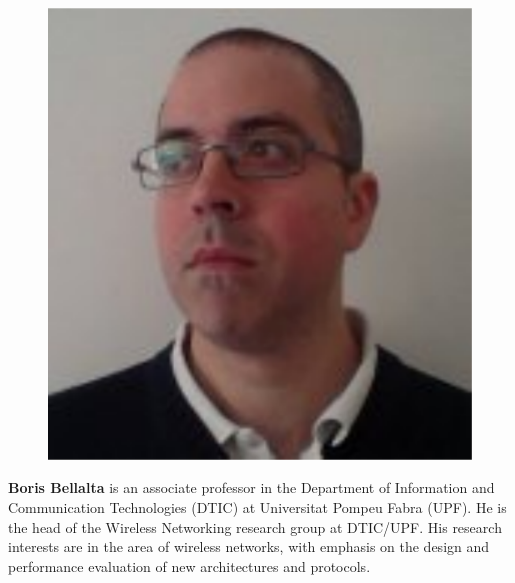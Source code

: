 \documentclass[10pt,a4paper,twocolumn]{article}
\newcommand{\ITUpar}{\vspace{8pt}\par}
\def\startfigure{\vspace{6pt}\begin{figure}[ht]\center}
\begin{document}
\startfigure\includegraphics[width=0.4\columnwidth]{img/bbellalta} 
\end{figure}\textbf{Boris Bellalta} is an associate professor in the Department of Information and Communication Technologies (DTIC) at Universitat Pompeu Fabra (UPF). He is the head of the Wireless Networking research group at DTIC/UPF. His research interests are in the area of wireless networks, with emphasis on the design and performance evaluation of new architectures and protocols.
\ITUpar
\end{document}
